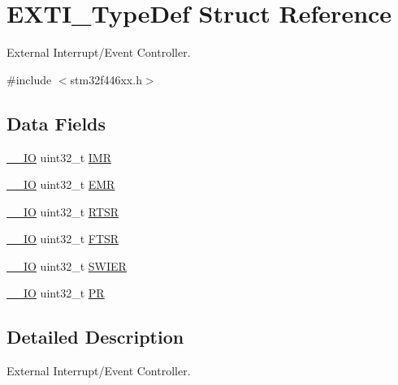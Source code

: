 \hypertarget{struct_e_x_t_i___type_def}{}\section{E\+X\+T\+I\+\_\+\+Type\+Def Struct Reference}
\label{struct_e_x_t_i___type_def}


External Interrupt/\+Event Controller.  




{\ttfamily \#include $<$stm32f446xx.\+h$>$}

\subsection*{Data Fields}
\begin{DoxyCompactItemize}
\item 
\mbox{\hyperlink{core__sc300_8h_aec43007d9998a0a0e01faede4133d6be}{\+\_\+\+\_\+\+IO}} uint32\+\_\+t \mbox{\hyperlink{struct_e_x_t_i___type_def_ae845b86e973b4bf8a33c447c261633f6}{I\+MR}}
\item 
\mbox{\hyperlink{core__sc300_8h_aec43007d9998a0a0e01faede4133d6be}{\+\_\+\+\_\+\+IO}} uint32\+\_\+t \mbox{\hyperlink{struct_e_x_t_i___type_def_a6034c7458d8e6030f6dacecf0f1a3a89}{E\+MR}}
\item 
\mbox{\hyperlink{core__sc300_8h_aec43007d9998a0a0e01faede4133d6be}{\+\_\+\+\_\+\+IO}} uint32\+\_\+t \mbox{\hyperlink{struct_e_x_t_i___type_def_a0d952a17455687d6e9053730d028fa1d}{R\+T\+SR}}
\item 
\mbox{\hyperlink{core__sc300_8h_aec43007d9998a0a0e01faede4133d6be}{\+\_\+\+\_\+\+IO}} uint32\+\_\+t \mbox{\hyperlink{struct_e_x_t_i___type_def_aa0f7c828c46ae6f6bc9f66f11720bbe6}{F\+T\+SR}}
\item 
\mbox{\hyperlink{core__sc300_8h_aec43007d9998a0a0e01faede4133d6be}{\+\_\+\+\_\+\+IO}} uint32\+\_\+t \mbox{\hyperlink{struct_e_x_t_i___type_def_a9eae93b6cc13d4d25e12f2224e2369c9}{S\+W\+I\+ER}}
\item 
\mbox{\hyperlink{core__sc300_8h_aec43007d9998a0a0e01faede4133d6be}{\+\_\+\+\_\+\+IO}} uint32\+\_\+t \mbox{\hyperlink{struct_e_x_t_i___type_def_af8d25514079514d38c104402f46470af}{PR}}
\end{DoxyCompactItemize}


\subsection{Detailed Description}
External Interrupt/\+Event Controller. 


